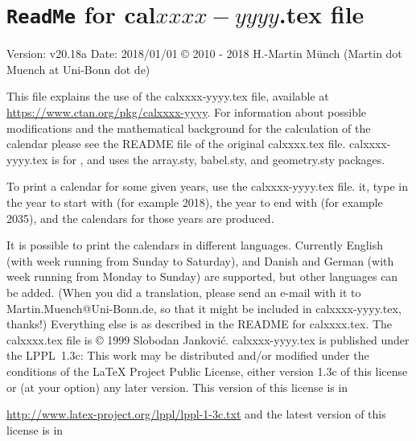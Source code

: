 \documentclass{article}
\begin{document}
\section*{\texttt{ReadMe} for cal$xxxx-yyyy$.tex file}
Version: v20.18a\newline
Date: 2018/01/01\newline
\copyright{} 2010 - 2018 H.-Martin M\"{u}nch (Martin dot Muench at Uni-Bonn dot de)\newline

\noindent This file explains the use of the \textsf{calxxxx-yyyy.tex} file,
available at\newline
\url{https://www.ctan.org/pkg/calxxxx-yyyy}.\newline
\noindent For information about possible modifications and the mathematical background
for the calculation of the calendar please see the README file of the original
\textsf{calxxxx.tex} file. \textsf{calxxxx-yyyy.tex} is for \LaTeXe, and uses
the \textsf{array.sty}, \textsf{babel.sty}, and \textsf{geometry.sty} packages.

\hspace*{-1.98471pt}To print a calendar for some given years,
use the \textsf{calxxxx-yyyy.tex} file. \LaTeXe{} it, type in the year to start with
(for example 2018), the year to end with (for example 2035), and the calendars
for those years are produced.

It is possible to print the calendars in different languages. Currently
English (with week running from Sunday to Saturday),
and Danish and German (with week running from Monday to Sunday) are supported,
but other languages can be added. (When you did a translation, please send
an e-mail with it to {\nolinebreak Martin.Muench@Uni-Bonn.de,}
so that it might be included in \textsf{calxxxx-yyyy.tex}, thanks!)\newline
Everything else is as described in the README for \textsf{calxxxx.tex}.\newline
The \textsf{calxxxx.tex} file is \copyright{} 1999 Slobodan Jankovi\'{c}.\newline
\textsf{calxxxx-yyyy.tex} is published under the LPPL~1.3c: This work may be
distributed and/or modified under the conditions of the \LaTeX{} Project
Public License, either version 1.3c of this license or (at your option) any
later version. This version of this license is in

\url{http://www.latex-project.org/lppl/lppl-1-3c.txt}\newline
and the latest version of this license is in
\end{document}
